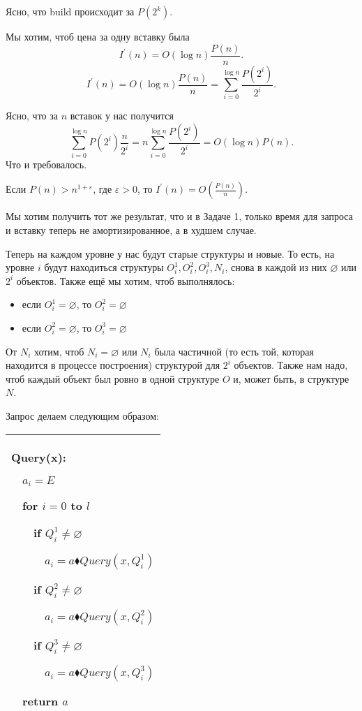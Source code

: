 Ясно, что build происходит за $P\left(2^k\right)$.


Мы хотим, чтоб цена за одну вставку была
$$I^\prime(n)=O(\log n )\frac{P(n)}{n}.$$
$$I^\prime(n)=O(\log n )\frac{P(n)}{n}=\sum_{i=0}^{\log n}\frac{P(2^i)}{2^i}.$$

Ясно, что за $n$ вставок у нас получится
$$\sum_{i=0}^{\log n}P\left(2^i\right)\frac{n}{2^i} =n \sum_{i=0}^{\log n}\frac{P(2^i)}{2^i} = O(\log n)P(n).$$
Что и требовалось.

\begin{remark}
Если $P(n)>n^{1+\varepsilon}$, где $\varepsilon>0$, то $I^\prime(n)=O\left(\frac{P(n)}{n}\right)$.
\end{remark}

\begin{task}
Мы хотим получить тот же результат, что и в Задаче 1, только время для запроса и вставку теперь не амортизированное, а в худшем случае.
\end{task}
Теперь на каждом уровне у нас будут старые структуры и новые. То есть, на уровне $i$ будут находиться структуры $O_i^1,O_i^2,O_i^3,N_i$, снова в каждой из них $\varnothing$ или $2^i$ объектов. Также ещё мы хотим, чтоб выполнялось:
\begin{itemize}
    \item если $O_i^1=\varnothing$, то $O_i^2 = \varnothing$
    \item если $O_i^2=\varnothing$, то $O_i^3 = \varnothing$
\end{itemize}

От $N_i$ хотим, чтоб $N_i=\varnothing$ или $N_i$ была частичной (то есть той, которая находится в процессе построения) структурой для $2^i$ объектов. Также нам надо, чтоб каждый объект был ровно в одной структуре $O$ и, может быть, в структуре $N$.

Запрос делаем следующим образом:


\begin{tabular}{|p{5cm}|}
\hline
Query(x):

$\quad$$a_i=E$

$\quad$for $i=0$ to $l$

$\quad$$\quad$if $Q^1_i \ne \varnothing$

$\quad$$\quad$$\quad$$a_i=a \blacklozenge Query(x,Q^1_i)$

$\quad$$\quad$if $Q^2_i \ne \varnothing$

$\quad$$\quad$$\quad$$a_i=a \blacklozenge Query(x,Q^2_i)$

$\quad$$\quad$if $Q^3_i \ne \varnothing$

$\quad$$\quad$$\quad$$a_i=a \blacklozenge Query(x,Q^3_i)$

$\quad$return $a$\\

\hline
\end{tabular}

